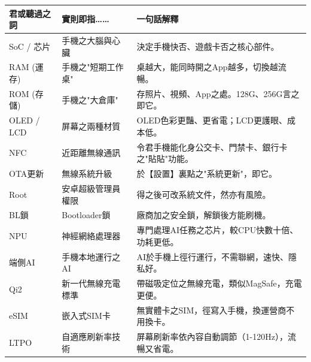 
\begin{center}
\begin{tabularx}{\linewidth}{|X|X|X|}
\hline
\textbf{君或聽過之詞} & \textbf{實則即指……} & \textbf{一句話解釋} \tabularnewline
\hline
SoC / 芯片 & 手機之大腦與心臟 & 決定手機快否、遊戲卡否之核心部件。 \tabularnewline
RAM (運存) & 手機之"短期工作桌" & 桌越大，能同時開之App越多，切換越流暢。 \tabularnewline
ROM (存儲) & 手機之"大倉庫" & 存照片、視頻、App之處。128G、256G言之即它。 \tabularnewline
OLED / LCD & 屏幕之兩種材質 & OLED色彩更豔、更省電；LCD更護眼、成本低。 \tabularnewline
NFC & 近距離無線通訊 & 令君手機能化身公交卡、門禁卡、銀行卡之"貼貼"功能。 \tabularnewline
OTA更新 & 無線系統升級 & 於【設置】裏點之"系統更新"，即它。 \tabularnewline
Root & 安卓超級管理員權限 & 得之後可改系統文件，然亦有風險。 \tabularnewline
BL鎖 & Bootloader鎖 & 廠商加之安全鎖，解鎖後方能刷機。 \tabularnewline
NPU & 神經網絡處理器 & 專門處理AI任務之芯片，較CPU快數十倍、功耗更低。 \tabularnewline
端側AI & 手機本地運行之AI & AI於手機上徑行運行，不需聯網，速快、隱私好。 \tabularnewline
Qi2 & 新一代無線充電標準 & 帶磁吸定位之無線充電，類似MagSafe，充電更便。 \tabularnewline
eSIM & 嵌入式SIM卡 & 無實體卡之SIM，徑寫入手機，換運營商不用換卡。 \tabularnewline
LTPO & 自適應刷新率技術 & 屏幕刷新率依內容自動調節（1-120Hz），流暢又省電。 \tabularnewline
\hline
\end{tabularx}
\end{center}
